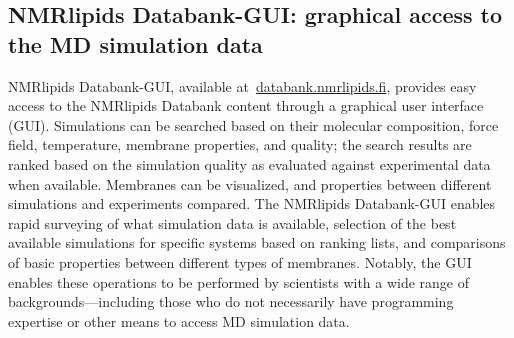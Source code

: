 \documentclass[fleqn,10pt]{wlscirep}
\begin{document}
\subsection{NMRlipids Databank-GUI: graphical access to the MD simulation data}
NMRlipids Databank-GUI, available at~\href{https://www.databank.nmrlipids.fi}{databank.nmrlipids.fi}, provides easy access to the NMRlipids Databank content through a graphical user interface (GUI). Simulations can be searched based on their molecular composition, force field, temperature, membrane properties, and quality; the search results are ranked based on the simulation quality as evaluated against experimental data when available. Membranes can be visualized, and properties between different simulations and experiments compared. The NMRlipids Databank-GUI enables rapid surveying of what simulation data is available, selection of the best available simulations for specific systems based on ranking lists, and comparisons of basic properties between different types of membranes. Notably, the GUI enables these operations to be performed by scientists with a wide range of backgrounds---including those who do not necessarily have programming expertise or other means to access MD simulation data. 
\end{document}
